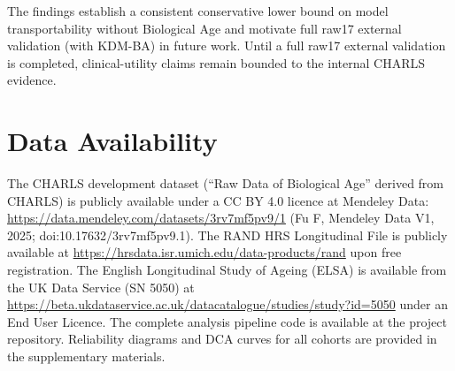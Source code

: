 \documentclass[11pt,a4paper]{article}
\begin{document}
The findings establish a consistent conservative lower bound on model transportability without
Biological Age and motivate full raw17 external validation (with KDM-BA) in future work. Until
a full raw17 external validation is completed, clinical-utility claims remain bounded to the
internal CHARLS evidence.

\section*{Data Availability}
The CHARLS development dataset (``Raw Data of Biological Age'' derived from CHARLS) is publicly
available under a CC BY 4.0 licence at Mendeley Data:
\url{https://data.mendeley.com/datasets/3rv7mf5pv9/1} (Fu F, Mendeley Data V1, 2025;
doi:10.17632/3rv7mf5pv9.1). The RAND HRS Longitudinal File is publicly available at
\url{https://hrsdata.isr.umich.edu/data-products/rand} upon free registration. The English
Longitudinal Study of Ageing (ELSA) is available from the UK Data Service (SN 5050) at
\url{https://beta.ukdataservice.ac.uk/datacatalogue/studies/study?id=5050} under an End User
Licence. The complete analysis pipeline code is available at the project repository. Reliability
diagrams and DCA curves for all cohorts are provided in the supplementary materials.
\end{document}
